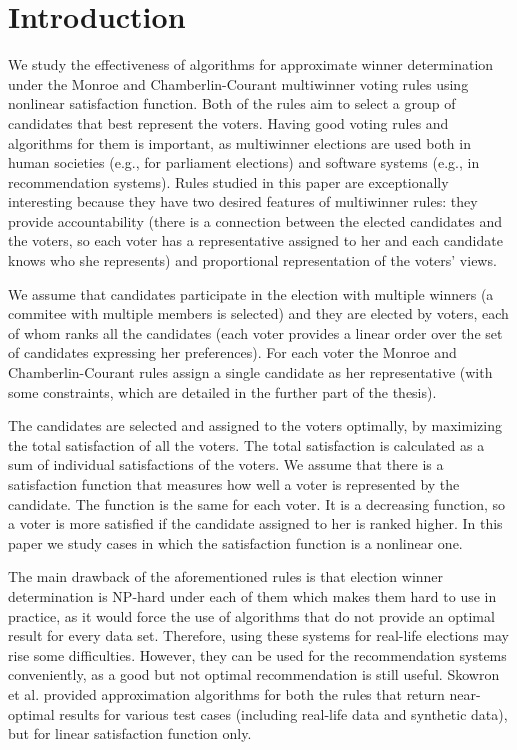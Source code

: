 \chapter{Introduction}
\label{cha:introduction}

We study the effectiveness of algorithms for approximate winner determination under the Monroe \cite{8} and Chamberlin-Courant \cite{9} multiwinner voting rules using nonlinear satisfaction function. Both of the rules aim to select a group of candidates that best represent the voters. Having good voting rules and algorithms for them is important, as multiwinner elections are used both in human societies (e.g., for parliament elections) and software systems (e.g., in recommendation systems). Rules studied in this paper are exceptionally interesting because they have two desired features of multiwinner rules: they provide accountability (there is a connection between the elected candidates and the voters, so each voter has a representative assigned to her and each candidate knows who she represents) and proportional representation of the voters’ views.

We assume that candidates participate in the election with multiple winners (a commitee with multiple members is selected) and they are elected by voters, each of whom ranks all the candidates (each voter provides a linear order over the set of candidates expressing her preferences). For each voter the Monroe and Chamberlin-Courant rules assign a single candidate as her representative (with some constraints, which are detailed in the further part of the thesis).

The candidates are selected and assigned to the voters optimally, by maximizing the total satisfaction of all the voters. The total satisfaction is calculated as a sum of individual satisfactions of the voters. We assume that there is a  satisfaction function that measures how well a voter is represented by the candidate. The function is the same for each voter. It is a decreasing function, so a voter is more satisfied if the candidate assigned to her is ranked higher. In this paper we study cases in which the satisfaction function is a nonlinear one.

The main drawback of the aforementioned rules is that election winner determination is NP-hard under each of them \cite{2} which makes them hard to use in practice, as it would force the use of algorithms that do not provide an optimal result for every data set. Therefore, using these systems for real-life elections may rise some difficulties. However, they can be used for the recommendation systems conveniently, as a good but not optimal recommendation is still useful. Skowron et al. \cite{1} provided approximation algorithms for both the rules that return near-optimal results for various test cases (including real-life data and synthetic data), but for linear satisfaction function only.

